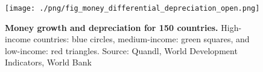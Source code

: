 \begin{figure}[h]
\caption{\label{fig:money_differential_depreciation_open} \textbf{Money growth and depreciation for 150 countries.} High-income countries: blue circles, medium-income: green squares, and low-income: red triangles. {\tiny Source: Quandl, World Development Indicators, World Bank}}
\hspace*{-.5cm}\texttt{[image: ./png/fig\_money\_differential\_depreciation\_open.png]}
\end{figure}